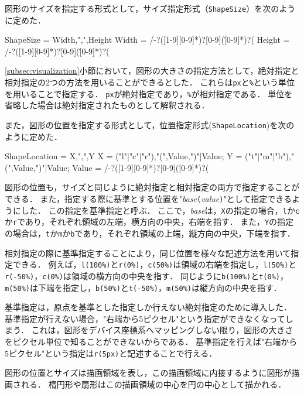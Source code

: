 図形のサイズを指定する形式として，サイズ指定形式（{\tt ShapeSize}）を次のように定めた．

\begin{EBNF}
ShapeSize = Width,",",Height
Width = /-?([1-9][0-9]*)?[0-9](\.[0-9]*)?(%
Height = /-?([1-9][0-9]*)?[0-9](\.[0-9]*)?(%
\end{EBNF}

\ref{subsec:visualization}小節において，図形の大きさの指定方法として，絶対指定と相対指定の2つの方法を用いることができるとした．
これらは{\tt px}と{\tt \%}という単位を用いることで指定する．
{\tt px}が絶対指定であり，{\tt \%}が相対指定である．
単位を省略した場合は絶対指定されたものとして解釈される．

また，図形の位置を指定する形式として，位置指定形式({\tt ShapeLocation})を次のように定めた．

\begin{EBNF}
ShapeLocation = X,",",Y
X = ("l"|"c"|"r"),"(",Value,")"|Value;
Y = ("t"|"m"|"b"),"(",Value,")"|Value;
Value = /-?([1-9][0-9]*)?[0-9](\.[0-9]*)?(%
\end{EBNF}

図形の位置も，サイズと同じように絶対指定と相対指定の両方で指定することができる．
また，指定する際に基準とする位置を"{\it base}\verb|(|{\it value}\verb|)|"として指定できるようにした．
この指定を基準指定と呼ぶ．
ここで，{\it base}は，{\tt X}の指定の場合，{\tt l}か{\tt c}か{\tt r}であり，それぞれ領域の左端，横方向の中央，右端を指す．
また，{\tt Y}の指定の場合は，{\tt t}か{\tt m}か{\tt b}であり，それぞれ領域の上端，縦方向の中央，下端を指す．

相対指定の際に基準指定することにより，同じ位置を様々な記述方法を用いて指定できる．
例えば，{\tt l(100\%)}と{\tt r(0\%)}，{\tt c(50\%)}は領域の右端を指定し，{\tt l(50\%)}と{\tt r(-50\%)}，{\tt c(0\%)}は領域の横方向の中央を指す．
同じように{\tt b(100\%)}と{\tt t(0\%)}，{\tt m(50\%)}は下端を指定し，{\tt b(50\%)}と{\tt t(-50\%)}，{\tt m(50\%)}は縦方向の中央を指す．

基準指定は，原点を基準とした指定しか行えない絶対指定のために導入した．
基準指定が行えない場合，"右端から5ピクセル"という指定ができなくなってしまう．
これは，図形をデバイス座標系へマッピングしない限り，図形の大きさをピクセル単位で知ることができないからである．
基準指定を行えば"右端から5ピクセル"という指定は{\tt r(5px)}と記述することで行える．

図形の位置とサイズは描画領域を表し，この描画領域に内接するように図形が描画される．
楕円形や扇形はこの描画領域の中心を円の中心として描かれる．

